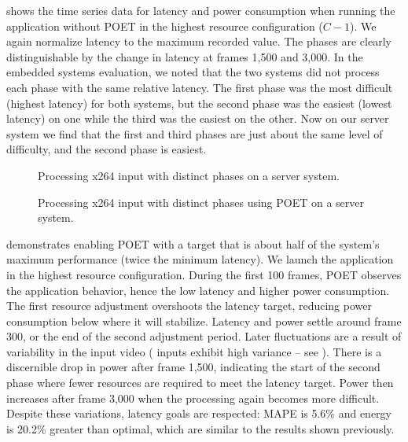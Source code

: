  shows the time series data for latency and power consumption when running the application without POET in the highest resource configuration ($C-1$).
We again normalize latency to the maximum recorded value.
The phases are clearly distinguishable by the change in latency at frames 1,500 and 3,000.
In the embedded systems evaluation, we noted that the two systems did not process each phase with the same relative latency.
The first phase was the most difficult (highest latency) for both systems, but the second phase was the easiest (lowest latency) on one while the third was the easiest on the other.
Now on our server system we find that the first and third phases are just about the same level of difficulty, and the second phase is easiest.

\begin{figure}[t]
  \centering
  
  \caption{Processing x264 input with distinct phases on a server system.}
  \label{fig:poet-server-phases-default}
\end{figure}
\begin{figure}[t]
  \centering
      
  \caption{Processing x264 input with distinct phases using POET on a server system.}
  \label{fig:poet-server-phases-x264}
\end{figure}

 demonstrates enabling POET with a target that is about half of the system's maximum performance (twice the minimum latency).
We launch the application in the highest resource configuration.
During the first 100 frames, POET observes the application behavior, hence the low latency and higher power consumption.
The first resource adjustment overshoots the latency target, reducing power consumption below where it will stabilize.
Latency and power settle around frame 300, or the end of the second adjustment period.
Later fluctuations are a result of variability in the input video ( inputs exhibit high variance -- see ).
There is a discernible drop in power after frame 1,500, indicating the start of the second phase where fewer resources are required to meet the latency target.
Power then increases after frame 3,000 when the processing again becomes more difficult.
Despite these variations, latency goals are respected: MAPE is 5.6\% and energy is 20.2\% greater than optimal, which are similar to the  results shown previously.


